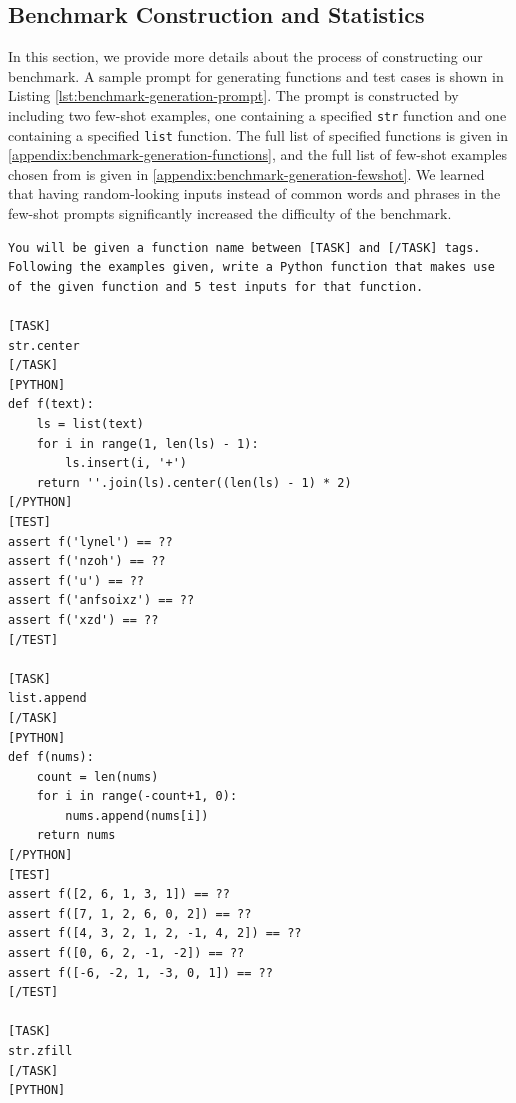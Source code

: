 \subsection{Benchmark Construction and Statistics} \label{appendix:construction}
In this section, we provide more details about the process of constructing our benchmark. A sample prompt for generating functions and test cases is shown in Listing \ref{lst:benchmark-generation-prompt}. The prompt is constructed by including two few-shot examples, one containing a specified \texttt{str} function and one containing a specified \texttt{list} function. The full list of specified functions is given in \ref{appendix:benchmark-generation-functions}, and the full list of few-shot examples chosen from is given in \ref{appendix:benchmark-generation-fewshot}. We learned that having random-looking inputs instead of common words and phrases in the few-shot prompts significantly increased the difficulty of the benchmark.

\begin{lstlisting}[caption={Sample prompt for generating functions and test cases},label={lst:benchmark-generation-prompt}, captionpos=t, breaklines=true]
You will be given a function name between [TASK] and [/TASK] tags. Following the examples given, write a Python function that makes use of the given function and 5 test inputs for that function.

[TASK]
str.center
[/TASK]
[PYTHON]
def f(text):
    ls = list(text)
    for i in range(1, len(ls) - 1):
        ls.insert(i, '+')
    return ''.join(ls).center((len(ls) - 1) * 2)
[/PYTHON]
[TEST]
assert f('lynel') == ??
assert f('nzoh') == ??
assert f('u') == ??
assert f('anfsoixz') == ??
assert f('xzd') == ??
[/TEST]

[TASK]
list.append
[/TASK]
[PYTHON]
def f(nums):
    count = len(nums)
    for i in range(-count+1, 0):
        nums.append(nums[i])
    return nums
[/PYTHON]
[TEST]
assert f([2, 6, 1, 3, 1]) == ??
assert f([7, 1, 2, 6, 0, 2]) == ??
assert f([4, 3, 2, 1, 2, -1, 4, 2]) == ??
assert f([0, 6, 2, -1, -2]) == ??
assert f([-6, -2, 1, -3, 0, 1]) == ??
[/TEST]

[TASK]
str.zfill
[/TASK]
[PYTHON]
\end{lstlisting}

